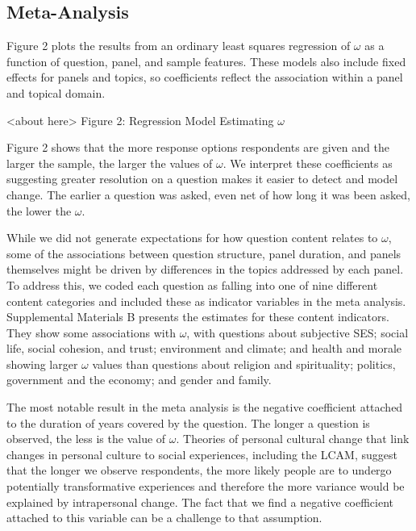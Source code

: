 \documentclass[
  12pt,
]{article}
\begin{document}
\hypertarget{meta-analysis}{%
\subsection{Meta-Analysis}\label{meta-analysis}}

Figure 2 plots the results from an ordinary least squares regression of
\(\omega\) as a function of question, panel, and sample features. These
models also include fixed effects for panels and topics, so coefficients
reflect the association within a panel and topical domain.

\begin{center}
<about here>
Figure 2: Regression Model Estimating $\omega$
\end{center}

Figure 2 shows that the more response options respondents are given and
the larger the sample, the larger the values of \(\omega\). We interpret
these coefficients as suggesting greater resolution on a question makes
it easier to detect and model change. The earlier a question was asked,
even net of how long it was been asked, the lower the \(\omega\).

While we did not generate expectations for how question content relates
to \(\omega\), some of the associations between question structure,
panel duration, and panels themselves might be driven by differences in
the topics addressed by each panel. To address this, we coded each
question as falling into one of nine different content categories and
included these as indicator variables in the meta analysis. Supplemental
Materials B presents the estimates for these content indicators. They
show some associations with \(\omega\), with questions about subjective
SES; social life, social cohesion, and trust; environment and climate;
and health and morale showing larger \(\omega\) values than questions
about religion and spirituality; politics, government and the economy;
and gender and family.

The most notable result in the meta analysis is the negative coefficient
attached to the duration of years covered by the question. The longer a
question is observed, the less is the value of \(\omega\). Theories of
personal cultural change that link changes in personal culture to social
experiences, including the LCAM, suggest that the longer we observe
respondents, the more likely people are to undergo potentially
transformative experiences and therefore the more variance would be
explained by intrapersonal change. The fact that we find a negative
coefficient attached to this variable can be a challenge to that
assumption.
\end{document}
